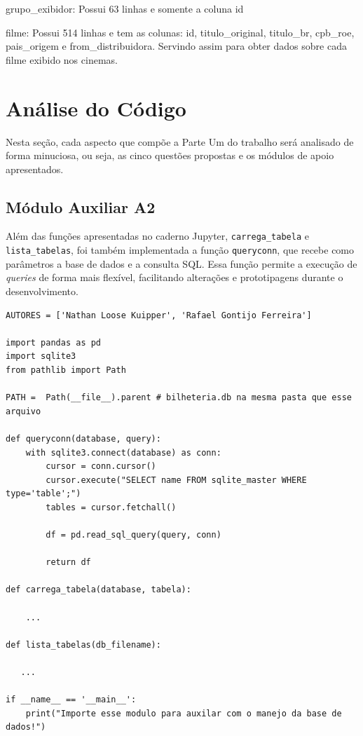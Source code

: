 \documentclass{article}
\begin{document}
grupo_exibidor: Possui 63 linhas e somente a coluna id

filme: Possui 514 linhas e tem as colunas: id, titulo_original, titulo_br, cpb_roe, pais_origem e from_distribuidora. Servindo assim para obter dados sobre cada filme exibido nos cinemas.

\section{Análise do Código}
Nesta seção, cada aspecto que compõe a Parte Um do trabalho será analisado de forma minuciosa, ou seja, as cinco questões propostas e os módulos de apoio apresentados.
\subsection*{Módulo Auxiliar A2}
Além das funções apresentadas no caderno Jupyter, \texttt{carrega\_tabela} e \texttt{lista\_tabelas}, foi também implementada a função \texttt{queryconn}, que recebe como parâmetros a base de dados e a consulta SQL. Essa função permite a execução de \textit{queries} de forma mais flexível, facilitando alterações e prototipagens durante o desenvolvimento.
\linespread{1}
\begin{lstlisting}
AUTORES = ['Nathan Loose Kuipper', 'Rafael Gontijo Ferreira']

import pandas as pd 
import sqlite3
from pathlib import Path

PATH =  Path(__file__).parent # bilheteria.db na mesma pasta que esse arquivo

def queryconn(database, query):
    with sqlite3.connect(database) as conn:
        cursor = conn.cursor()
        cursor.execute("SELECT name FROM sqlite_master WHERE type='table';")
        tables = cursor.fetchall()

        df = pd.read_sql_query(query, conn)
        
        return df
    
def carrega_tabela(database, tabela):

    ...

def lista_tabelas(db_filename):

   ...
    
if __name__ == '__main__':
    print("Importe esse modulo para auxilar com o manejo da base de dados!")
\end{lstlisting}
\linespread{1.5}
\end{document}
